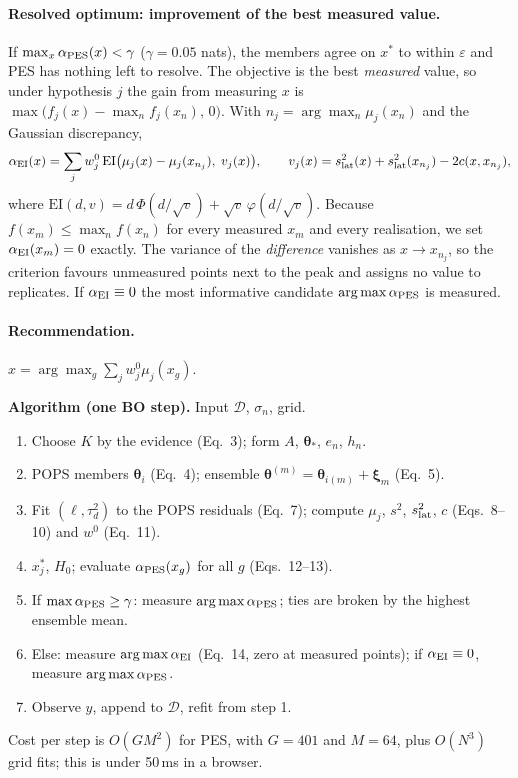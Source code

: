 \documentclass[11pt,a4paper]{article}
\newcommand{\btheta}{\bm{\theta}}
\begin{document}
\paragraph{Resolved optimum: improvement of the best measured value.} If $\max_x\alpha_{\rm PES}(x) < \gamma$ ($\gamma=0.05$ nats),
the members agree on $x^*$ to within $\varepsilon$ and PES has nothing left to resolve. The objective is the best \emph{measured}
value, so under hypothesis $j$ the gain from measuring $x$ is $\max\bigl(f_j(x)-\max_n f_j(x_n),\,0\bigr)$. With
$n_j = \arg\max_n\mu_j(x_n)$ and the Gaussian discrepancy,
\begin{equation}
\alpha_{\rm EI}(x) = \sum_j w^0_j\,\mathrm{EI}\bigl(\mu_j(x)-\mu_j(x_{n_j}),\;v_j(x)\bigr),\qquad
v_j(x) = s^2_{\rm lat}(x)+s^2_{\rm lat}(x_{n_j}) - 2c(x,x_{n_j}),
\end{equation}
where $\mathrm{EI}(d,v) = d\,\Phi(d/\sqrt v) + \sqrt v\,\varphi(d/\sqrt v)$. Because $f(x_m)\le\max_n f(x_n)$ for every measured $x_m$ and every
realisation, we set $\alpha_{\rm EI}(x_m)=0$ exactly. The variance of the \emph{difference} vanishes as $x\to x_{n_j}$, so
the criterion favours unmeasured points next to the peak and assigns no value to replicates. If $\alpha_{\rm EI}\equiv 0$ the
most informative candidate $\arg\max\alpha_{\rm PES}$ is measured.

\paragraph{Recommendation.} $\hat x = \arg\max_g\sum_j w^0_j\mu_j(x_g)$.

\begin{framed}
\noindent\textbf{Algorithm (one BO step).} Input $\mathcal D$, $\sigma_n$, grid.
\begin{enumerate}[leftmargin=1.6em,itemsep=1pt]
\item Choose $K$ by the evidence (Eq.~3); form $A$, $\btheta_*$, $e_n$, $h_n$.
\item POPS members $\btheta_i$ (Eq.~4); ensemble $\btheta^{(m)} = \btheta_{i(m)}+\bm\xi_m$ (Eq.~5).
\item Fit $(\ell,\tau_d^2)$ to the POPS residuals (Eq.~7); compute $\mu_j$, $s^2$, $s^2_{\rm lat}$, $c$ (Eqs.~8--10) and $w^0$ (Eq.~11).
\item $x^*_j$, $H_0$; evaluate $\alpha_{\rm PES}(x_g)$ for all $g$ (Eqs.~12--13).
\item If $\max\alpha_{\rm PES}\ge\gamma$: measure $\arg\max\alpha_{\rm PES}$; ties are broken by the highest ensemble mean.
\item Else: measure $\arg\max\alpha_{\rm EI}$ (Eq.~14, zero at measured points); if $\alpha_{\rm EI}\equiv0$, measure $\arg\max\alpha_{\rm PES}$.
\item Observe $y$, append to $\mathcal D$, refit from step 1.
\end{enumerate}
Cost per step is $O(GM^2)$ for PES, with $G=401$ and $M=64$, plus $O(N^3)$ grid fits; this is under 50\,ms in a browser.
\end{framed}
\end{document}
